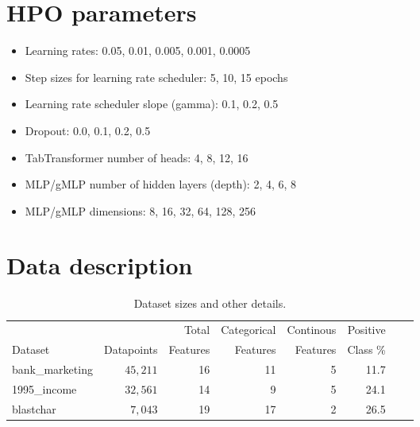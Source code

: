 \documentclass{article}
\begin{document}
\nocite{*}



\pagebreak

\appendix
\small
{}

\section{HPO parameters}
\label{appendix:hpo}

\begin{itemize}
    \item Learning rates: 0.05, 0.01, 0.005, 0.001, 0.0005
    \item Step sizes for learning rate scheduler: 5, 10, 15 epochs
    \item Learning rate scheduler slope (gamma): 0.1, 0.2, 0.5
    \item Dropout: 0.0, 0.1, 0.2, 0.5
    \item TabTransformer number of heads: 4, 8, 12, 16
    \item MLP/gMLP number of hidden layers (depth): 2, 4, 6, 8
    \item MLP/gMLP dimensions: 8, 16, 32, 64, 128, 256
\end{itemize}

\section{Data description}
\label{appendix:data}

\begin{table}[htp]
\caption{
	Dataset sizes and other details.
}
\label{tab:data-details}
\centering
	\begin{tabular}{lrrrrrrr}
		\toprule
		        &            & Total    & Categorical & Continous & Positive \\
		Dataset & Datapoints & Features & Features    & Features  & Class \% \\
		\midrule
		bank\_marketing  &   $45,211$ &       16 &    11 &    5 &     11.7 \\
		1995\_income     &   $32,561$ &       14 &     9 &     5 &     24.1 \\
		blastchar        &    $7,043$ &       19 &    17 &     2 &     26.5 \\
		\bottomrule
    \end{tabular}
\end{table}

\begin{table}[htp]
\caption{Dataset sources. From \cite{Huang2020TabTransformerTD}.}
\label{tab:dataset-urls}
\centering
{}
\end{table}
\end{document}
